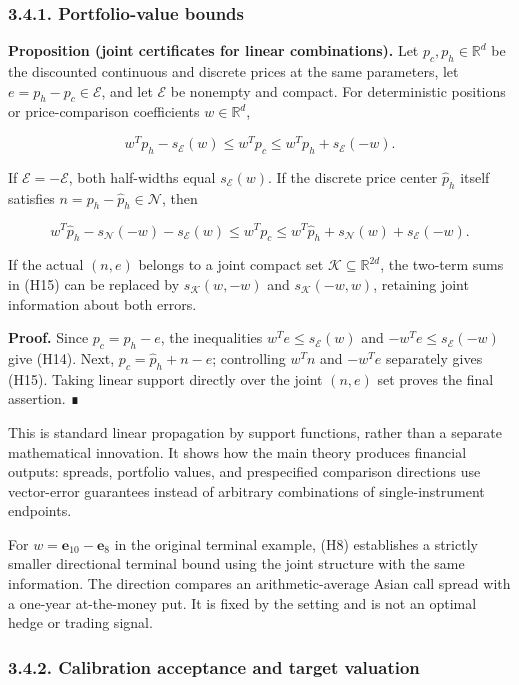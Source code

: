 \documentclass[a4paper,11pt]{article}
\begin{document}
\subsubsection*{3.4.1. Portfolio-value bounds}

\textbf{Proposition (joint certificates for linear combinations).} Let $p_c,p_h\in\mathbb R^d$ be the discounted continuous and discrete prices at the same parameters, let $e=p_h-p_c\in\mathcal E$, and let $\mathcal E$ be nonempty and compact. For deterministic positions or price-comparison coefficients $w\in\mathbb R^d$,

\[
w^Tp_h-s_{\mathcal E}(w)
\le w^Tp_c\le
w^Tp_h+s_{\mathcal E}(-w).
\tag{H14}
\]

If $\mathcal E=-\mathcal E$, both half-widths equal $s_{\mathcal E}(w)$. If the discrete price center $\widehat p_h$ itself satisfies $n=p_h-\widehat p_h\in\mathcal N$, then

\[
w^T\widehat p_h-s_{\mathcal N}(-w)-s_{\mathcal E}(w)
\le w^Tp_c\le
w^T\widehat p_h+s_{\mathcal N}(w)+s_{\mathcal E}(-w).
\tag{H15}
\]

If the actual $(n,e)$ belongs to a joint compact set $\mathcal K\subseteq\mathbb R^{2d}$, the two-term sums in (H15) can be replaced by $s_{\mathcal K}(w,-w)$ and $s_{\mathcal K}(-w,w)$, retaining joint information about both errors.

\textbf{Proof.} Since $p_c=p_h-e$, the inequalities $w^Te\le s_{\mathcal E}(w)$ and $-w^Te\le s_{\mathcal E}(-w)$ give (H14). Next, $p_c=\widehat p_h+n-e$; controlling $w^Tn$ and $-w^Te$ separately gives (H15). Taking linear support directly over the joint $(n,e)$ set proves the final assertion. ∎

This is standard linear propagation by support functions, rather than a separate mathematical innovation. It shows how the main theory produces financial outputs: spreads, portfolio values, and prespecified comparison directions use vector-error guarantees instead of arbitrary combinations of single-instrument endpoints.

For $w=\mathbf e_{10}-\mathbf e_8$ in the original terminal example, (H8) establishes a strictly smaller directional terminal bound using the joint structure with the same information. The direction compares an arithmetic-average Asian call spread with a one-year at-the-money put. It is fixed by the setting and is not an optimal hedge or trading signal.

\subsubsection*{3.4.2. Calibration acceptance and target valuation}
\end{document}
